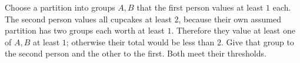 Choose a partition into groups $A,B$ that the first person values at least $1$ each. The second person values all cupcakes at least $2$, because their own assumed partition has two groups each worth at least $1$. Therefore they value at least one of $A,B$ at least $1$; otherwise their total would be less than $2$. Give that group to the second person and the other to the first. Both meet their thresholds.
